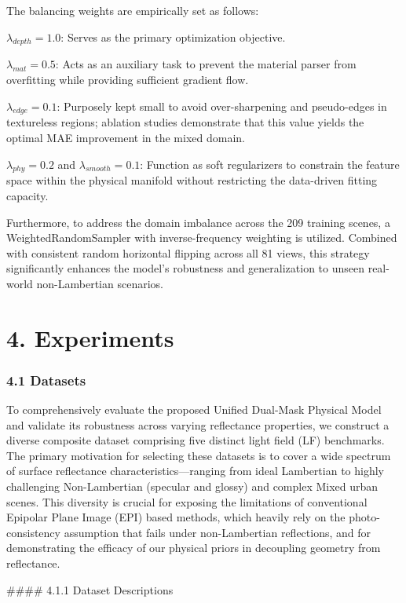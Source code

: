 \documentclass[journal]{IEEEtran}
\begin{document}
The balancing weights are empirically set as follows:
\item $\lambda_{depth} = 1.0$: Serves as the primary optimization objective.
\item $\lambda_{mat} = 0.5$: Acts as an auxiliary task to prevent the material parser from overfitting while providing sufficient gradient flow.
\item $\lambda_{edge} = 0.1$: Purposely kept small to avoid over-sharpening and pseudo-edges in textureless regions; ablation studies demonstrate that this value yields the optimal MAE improvement in the mixed domain.
\item $\lambda_{phy} = 0.2$ and $\lambda_{smooth} = 0.1$: Function as soft regularizers to constrain the feature space within the physical manifold without restricting the data-driven fitting capacity.

Furthermore, to address the domain imbalance across the 209 training scenes, a WeightedRandomSampler with inverse-frequency weighting is utilized. Combined with consistent random horizontal flipping across all 81 views, this strategy significantly enhances the model's robustness and generalization to unseen real-world non-Lambertian scenarios.

\section{4. Experiments}

\subsubsection{4.1 Datasets}

To comprehensively evaluate the proposed Unified Dual-Mask Physical Model and validate its robustness across varying reflectance properties, we construct a diverse composite dataset comprising five distinct light field (LF) benchmarks. The primary motivation for selecting these datasets is to cover a wide spectrum of surface reflectance characteristics—ranging from ideal Lambertian to highly challenging Non-Lambertian (specular and glossy) and complex Mixed urban scenes. This diversity is crucial for exposing the limitations of conventional Epipolar Plane Image (EPI) based methods, which heavily rely on the photo-consistency assumption that fails under non-Lambertian reflections, and for demonstrating the efficacy of our physical priors in decoupling geometry from reflectance.

\#\#\#\# 4.1.1 Dataset Descriptions
\end{document}
